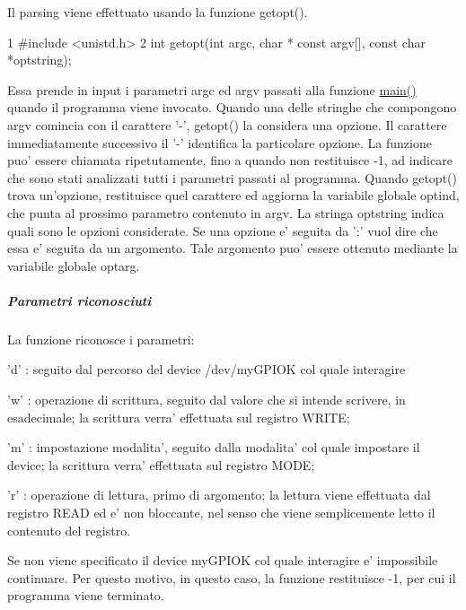 Il parsing viene effettuato usando la funzione getopt(). 
\begin{DoxyCode}
1 #include <unistd.h>
2 int getopt(int argc, char * const argv[], const char *optstring);
\end{DoxyCode}
 Essa prende in input i parametri argc ed argv passati alla funzione \hyperlink{group__userspace-gpio_ga3c04138a5bfe5d72780bb7e82a18e627}{main()} quando il programma viene invocato. Quando una delle stringhe che compongono argv comincia con il carattere '-\/', getopt() la considera una opzione. Il carattere immediatamente successivo il '-\/' identifica la particolare opzione. La funzione puo' essere chiamata ripetutamente, fino a quando non restituisce -\/1, ad indicare che sono stati analizzati tutti i parametri passati al programma. Quando getopt() trova un'opzione, restituisce quel carattere ed aggiorna la variabile globale optind, che punta al prossimo parametro contenuto in argv. La stringa optstring indica quali sono le opzioni considerate. Se una opzione e' seguita da '\+:' vuol dire che essa e' seguita da un argomento. Tale argomento puo' essere ottenuto mediante la variabile globale optarg.

\subparagraph*{Parametri riconosciuti}

La funzione riconosce i parametri\+:
\begin{DoxyItemize}
\item 'd' \+: seguito dal percorso del device /dev/my\+G\+P\+I\+O\+K col quale interagire
\item 'w' \+: operazione di scrittura, seguito dal valore che si intende scrivere, in esadecimale; la scrittura verra' effettuata sul registro W\+R\+I\+T\+E;
\item 'm' \+: impostazione modalita', seguito dalla modalita' col quale impostare il device; la scrittura verra' effettuata sul registro M\+O\+D\+E;
\item 'r' \+: operazione di lettura, primo di argomento; la lettura viene effettuata dal registro R\+E\+A\+D ed e' non bloccante, nel senso che viene semplicemente letto il contenuto del registro.
\end{DoxyItemize}

Se non viene specificato il device my\+G\+P\+I\+O\+K col quale interagire e' impossibile continuare. Per questo motivo, in questo caso, la funzione restituisce -\/1, per cui il programma viene terminato.